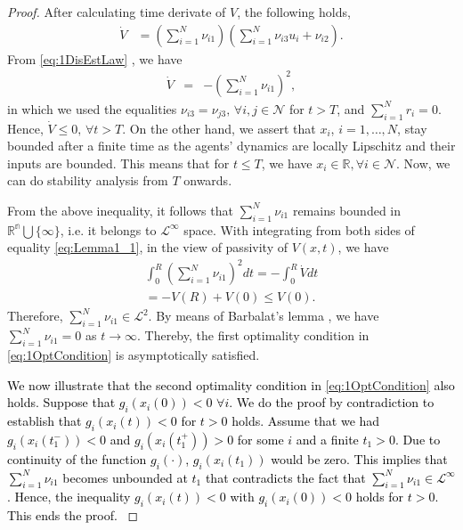 \documentclass[letterpaper, 10 pt, conference]{ieeeconf}  %
\begin{document}
{\begin{proof}
	After calculating time derivate of $V$, the following holds,
	\begin{align}
	\dot{V} & =\left(\sum_{i=1}^{N}\nu_{i1}\right)\left(\sum_{i=1}^{N}\nu_{i3}u_{i}+\nu_{i2}\right).
	\end{align}
	From \eqref{eq:1DisEstLaw} , we have
	\begin{eqnarray}
	\dot{V} & = & -\left(\sum_{i=1}^{N}\nu_{i1}\right)^{2},
	\end{eqnarray}
	in which we used the equalities $\nu_{i3}=\nu_{j3},\,\forall i,j\in\mathcal{{N}}$
	for $t>T$, and $\sum_{i=1}^{N}r_{i}=0$.  Hence, $\dot{V}\leq0,\,\forall t>T$.
	On the other hand, we assert that $x_{i}$, $i=1,\ldots,N$, stay
	bounded after a finite time as the agents' dynamics are locally Lipschitz
	and their inputs are bounded. This means that for $t\leq T$, we have
	$x_{i}\in\mathbb{{R}},\forall i \in \mathcal N $. Now, we can do stability analysis
	from $T$ onwards.

From the above inequality, it follows that ${\displaystyle \sum_{i=1}^{N}\nu_{i1}}$
remains bounded in $\mathbb{{R}^{\text{n}}\bigcup}\{\infty\}$, i.e.
it belongs to $\mathcal{{L}^{\infty}}$ space. With integrating from
both sides of equality \eqref{eq:Lemma1_1}, in the view of passivity
of $V(x,t)$, we have
\begin{gather*}
\int_{0}^{R}\left(\sum_{i=1}^{N}\nu_{i1}\right)^{2}dt=-\int_{0}^{R}\dot{V}dt\\
=-V(R)+V(0)\leq V(0).
\end{gather*}
Therefore, $\sum_{i=1}^{N}\nu_{i1}\in\mathcal{{L}}^{2}$.  By means
of Barbalat's lemma \cite{tao1997simple}, we have $\sum_{i=1}^{N}\nu_{i1}=0$
as $t\rightarrow\infty$. Thereby, the first optimality condition
in \eqref{eq:1OptCondition} is asymptotically satisfied.

\textcolor{black}{We now illustrate  that the second optimality condition
	in \eqref{eq:1OptCondition} also holds. Suppose that $g_{i}\left(x_{i}(0)\right)<0$
	$\forall i$. We  do the proof by contradiction to establish
	that $g_{i}\left(x_{i}(t)\right)<0$ for $t>0$ holds. Assume that we had
	$g_{i}\left(x_{i}(t_{1}^{-})\right)<0$ and $g_{i}\left(x_{i}(t_{1}^{+})\right)>0$
	for some $i$ and a finite $t_{1}>0$. Due to continuity of the function
	$g_{i}\left(\cdot\right)$, $g_{i}(x_{i}(t_{1}))$ would be zero.
	This implies that $\sum_{i=1}^{N}\nu_{i1}$ becomes unbounded at $t_{1}$
	that contradicts the fact that $\sum_{i=1}^{N}\nu_{i1}\in\mathcal{{L}^{\infty}}$.
	Hence, the inequality $g_{i}(x_{i}(t))<0$ with $g_{i}\left(x_{i}(0)\right)<0$
	holds for $t>0$. This ends the proof. }
\end{proof}

}
\end{document}
